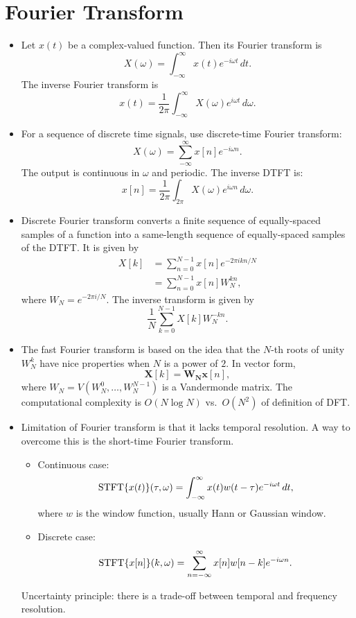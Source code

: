 \documentclass[../ds]{subfiles}
\begin{document}
\chapter{Fourier Transform}
\begin{itemize}
\item 
Let $x(t)$ be a complex-valued function. Then its Fourier transform is 
\[ X(\omega) = \int_{-\infty}^\infty x(t)e^{-i\omega t}\,dt. \]
The inverse Fourier transform is
\[ x(t) = \frac{1}{2\pi} \int_{-\infty}^\infty X(\omega)e^{i\omega t}\,d\omega. \]

\item 
For a sequence of discrete time signals, use discrete-time Fourier transform:
\[ X(\omega) = \sum_{-\infty}^\infty x[n]e^{-i\omega n}. \]
The output is continuous in $\omega$ and periodic. The inverse DTFT is:
\[ x[n] = \frac{1}{2\pi} \int_{2\pi} X(\omega)e^{i\omega n}\,d\omega. \]

\item
Discrete Fourier transform converts a finite sequence of equally-spaced samples of a function into a same-length sequence of equally-spaced samples of the DTFT. It is given by
\begin{align*} X[k] &= \sum_{n=0}^{N-1} x[n]e^{-2\pi i kn/N} \\&= \sum_{n=0}^{N-1} x[n]W_N^{kn},
\end{align*}
where $W_N = e^{-2\pi i/N}.$
The inverse transform is given by 
\[ \frac{1}{N} \sum_{k=0}^{N-1} X[k]W^{-kn}_N.\]

\item 
The fast Fourier transform is based on the idea that the $N$-th roots of unity $W_N^k$ have nice properties when $N$ is a power of $2.$ In vector form,
\[ \mathbf{X}[k] = \mathbf{W_N}\mathbf{x}[n], \]
where $W_N = V(W_N^0,\ldots,W_N^{N-1})$ is a Vandermonde matrix. The computational complexity is $O(N\log{N})$ vs.\ $O(N^2)$ of definition of DFT.

\item 
Limitation of Fourier transform is that it lacks temporal resolution. A way to overcome this is the short-time Fourier transform.
	\begin{itemize}
	\item 
	Continuous case:
	\[ \operatorname{STFT}\{x(t)\}(\tau, \omega) = \int_{-\infty}^{\infty} x(t)w(t - \tau)e^{-i\omega t}\,dt, \] where $w$ is the window function, usually Hann or Gaussian window.
	
	\item 
	Discrete case:
	\[ \operatorname{STFT}\{x[n]\}(k, \omega) = \sum_{n=-\infty}^{\infty} x[n]w[n-k]e^{-i\omega n}. \]
	\end{itemize}
Uncertainty principle: there is a trade-off between temporal and frequency resolution.


\end{itemize}
\end{document}
